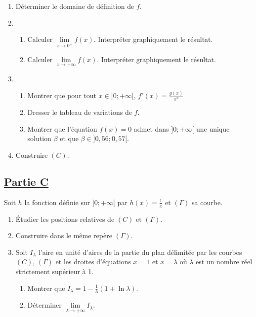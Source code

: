     \begin{enumerate}
        \item Déterminer le domaine de définition de \( f \).
        \item
              \begin{enumerate}
                  \item Calculer \( \lim\limits_{x \to 0^+} f(x) \). Interpréter graphiquement le résultat.
                  \item Calculer \( \lim\limits_{x \to +\infty} f(x) \). Interpréter graphiquement le résultat.
              \end{enumerate}
        \item
              \begin{enumerate}
                  \item Montrer que pour tout \( x \in ]0; +\infty[ \), \( f'(x) = \frac{g(x)}{x^2} \)
                  \item Dresser le tableau de variations de \( f \).
                  \item Montrer que l’équation \( f(x) = 0 \) admet dans \( ]0; +\infty[ \) une unique solution \( \beta \) et que  \( \beta \in ]0,56; 0,57[. \)
              \end{enumerate}
        \item Construire \( (C) \).
    \end{enumerate}
    \subsection*{\underline{\textbf{Partie C}}}
    Soit \( h \) la fonction définie sur \( ]0; +\infty[ \) par \( h(x) = \frac{1}{x} \) et \( (\Gamma) \) sa courbe.

    \begin{enumerate}
        \item Étudier les positions relatives de \( (C) \) et \( (\Gamma) \).
        \item Construire dans le même repère \( (\Gamma) \).
        \item Soit \( I_{\lambda} \) l’aire en unité d’aires de la partie du plan délimitée par les courbes \( (C) \), \( (\Gamma) \) et les droites d’équations \( x = 1 \) et \( x = \lambda \) où \( \lambda \) est un nombre réel strictement supérieur à 1.
              \begin{enumerate}
                  \item Montrer que \( I_{\lambda} = 1 - \frac{1}{\lambda} (1 + \ln \lambda). \)
                  \item Déterminer \( \lim\limits_{\lambda \to +\infty} I_{\lambda}. \)
              \end{enumerate}
    \end{enumerate}

